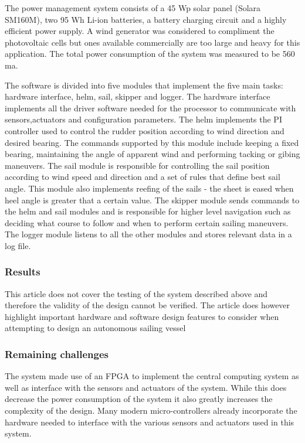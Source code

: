 The power management system consists of a 45 Wp solar panel (Solara SM160M), two 95 Wh Li-ion batteries, a battery charging circuit and a highly efficient power supply. A wind generator
was considered to compliment the photovoltaic cells but ones available commercially are too large and heavy for this application. The total power consumption of the system was measured
to be 560 ma.

The software is divided into five modules that implement the five main tasks: hardware interface, helm, sail, skipper and logger. The hardware interface implements all the driver 
software needed for the processor to communicate with sensors,actuators and configuration parameters. The helm implements the PI controller used to control the rudder position according
 to wind direction and desired bearing. The commands supported by this module include keeping a fixed bearing, maintaining the angle of apparent wind and performing tacking or gibing 
 maneuvers. The sail module is responsible for controlling the sail position according to wind speed and direction and a set of rules that define best sail angle. This module also implements 
 reefing of the sails - the sheet is eased when heel angle is greater that a certain value. The skipper module sends commands to the helm and sail modules and is responsible for higher
  level navigation such as deciding what course to follow and when to perform certain sailing maneuvers. The logger module listens to all the other modules and stores relevant data in a log file.

\subsubsection{Results}
This article does not cover the testing of the system described above and therefore the validity of the design cannot be verified. The article does however highlight important hardware 
and software design features to consider when attempting to design an autonomous sailing vessel

\subsubsection{Remaining challenges}

The system made use of an FPGA to implement the central computing system as well as interface with the sensors and actuators of the system. While this
 does decrease the power consumption of the system it also greatly increases the complexity of the design. Many modern micro-controllers already incorporate the hardware needed to 
 interface with the various sensors and actuators used in this system. 

